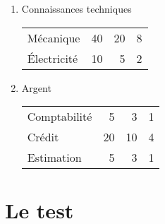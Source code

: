 \documentclass[11pt]{article}
\begin{document}
\begin{twocols}
\begin{enumerate}
\item Connaissances techniques
\label{sec:org91ac13c}

\begin{center}
\begin{tabular}{lrrr}
Mécanique & 40 & 20 & 8\\
Électricité & 10 & 5 & 2\\
\end{tabular}
\end{center}

\item Argent
\label{sec:org687246a}

\begin{center}
\begin{tabular}{lrrr}
Comptabilité & 5 & 3 & 1\\
Crédit & 20 & 10 & 4\\
Estimation & 5 & 3 & 1\\
\end{tabular}
\end{center}

\end{enumerate}

\end{twocols}


\section{Le test}
\label{sec:org551c715}
\end{document}
